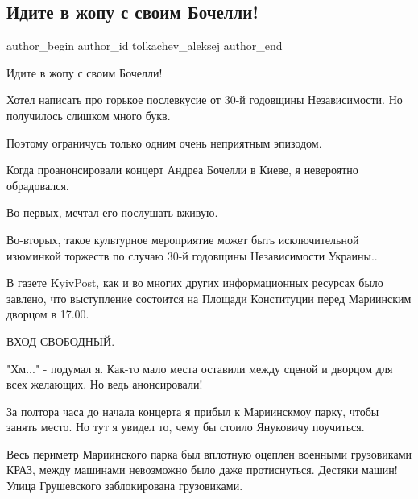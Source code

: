  
 
 
 
 
 
\subsection{Идите в жопу с своим Бочелли!}
\label{sec:25_08_2021.fb.tolkachev_aleksej.1.zhopa_bochelli_koncert}
 
\ifcmt
 author_begin
   author_id tolkachev_aleksej
 author_end
\fi

Идите в жопу с своим Бочелли!

Хотел написать про горькое послевкусие от 30-й годовщины Независимости. Но
получилось слишком много букв. 

Поэтому ограничусь только одним очень неприятным эпизодом. 

Когда проанонсировали концерт Андреа Бочелли в Киеве, я невероятно обрадовался. 

Во-первых, мечтал его послушать вживую. 

Во-вторых, такое культурное мероприятие может быть исключительной изюминкой
торжеств по случаю 30-й годовщины Независимости Украины.. 

В газете KyivPost, как и во многих других информационных ресурсах было завлено,
что выступление состоится на Площади Конституции перед Мариинским дворцом в
17.00.

ВХОД СВОБОДНЫЙ. 

"Хм..." - подумал я.  Как-то мало места оставили между сценой и дворцом для
всех желающих. Но ведь анонсировали! 

За полтора часа до начала концерта я прибыл к Мариинскмоу парку, чтобы занять
место. Но тут я увидел то, чему бы стоило Януковичу поучиться. 

Весь периметр Мариинского парка был вплотную оцеплен военными грузовиками КРАЗ,
между машинами невозможно было даже протиснуться. Дестяки машин! Улица
Грушевского заблокирована грузовиками. 

